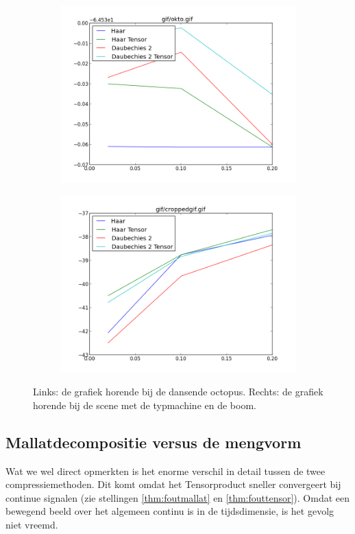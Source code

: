 \begin{figure}[h]
\centering
\begin{subfigure}[t]{0.48\textwidth}
\includegraphics[width=\linewidth]{plaatjes/cockto.png}
\end{subfigure}
\begin{subfigure}[t]{0.48\textwidth}
\includegraphics[width=\linewidth]{plaatjes/croppedgif.png}
\end{subfigure}
\caption{Links: de grafiek horende bij de dansende octopus. Rechts: de grafiek horende bij de scene met de typmachine en de boom.}
\label{fig:cockto}
\end{figure}

\subsection{Mallatdecompositie versus de mengvorm}
Wat we wel direct opmerkten is het enorme verschil in detail tussen de twee compressiemethoden. Dit komt omdat het Tensorproduct sneller convergeert bij continue signalen (zie stellingen \ref{thm:foutmallat} en \ref{thm:fouttensor}). Omdat een bewegend beeld over het algemeen continu is in de tijdsdimensie, is het gevolg niet vreemd.


